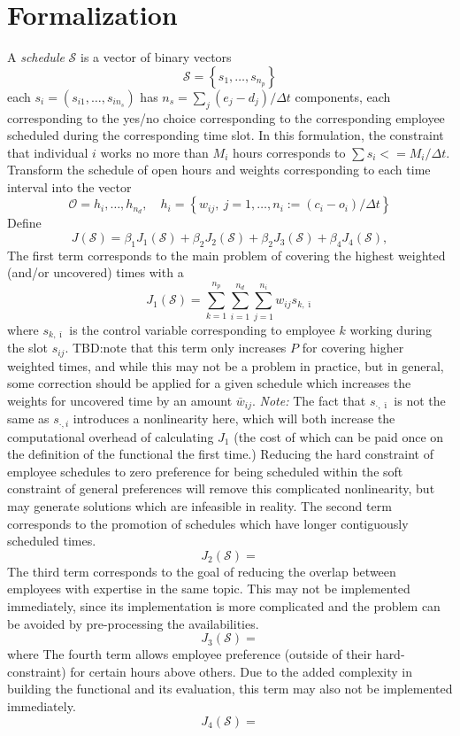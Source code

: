 \documentclass[11pt, draft]{amsart}
\newcommand{\bk}[1]{\left\{#1\right\}}
\def\S{\mathcal{S}}
\begin{document}
\section{Formalization}
A \emph{schedule} $\S$ is a vector of binary vectors
\[
  \S = \bk{s_1, \ldots, s_{n_p}}
\]
each $s_i = (s_{i1},\ldots,s_{in_s})$ has $n_s = \sum_j (e_j - d_j) / {\Delta t}$ components, each corresponding
to the yes/no choice corresponding to the corresponding employee scheduled
during the corresponding time slot.
In this formulation, the constraint that individual $i$ works no more than $M_i$
hours corresponds to $\sum s_i <= M_i / {\Delta t}$.
Transform the schedule of open hours and weights corresponding to each time interval into the vector
\[
  \mathcal{O} = {h_i, \ldots, h_{n_d}},
  \quad h_i = \bk{w_{ij},~j=1,\ldots, n_i := (c_i - o_i)/{\Delta t}}
\]
Define
\[
  J(\S) = \beta_1 J_1(\S) + \beta_2 J_2(\S) + \beta_2 J_3(\S) + \beta_4 J_4(\S),
\]
The first term corresponds to the main problem of covering the highest weighted (and/or uncovered) times with a
\[
  J_1(\S) = \sum_{k=1}^{n_p} \sum_{i=1}^{n_d} \sum_{j=1}^{n_i}w_{ij} s_{k,\bar{\imath}}
\]
where $s_{k,\bar{\imath}}$ is the control variable corresponding to employee $k$
working during the slot $s_{ij}$.
TBD:\@ note that this term only increases $P$ for covering higher weighted times, and while this may not be a problem in practice, but in general, some correction should be applied for a given schedule which increases the weights for uncovered time by an amount $\bar{w}_{ij}$.
\emph{Note:} The fact that $s_{\cdot,\bar{\imath}}$ is not the same as $s_{\cdot,i}$ introduces a nonlinearity here, which will both increase the computational overhead of calculating $J_1$ (the cost of which can be paid once on the definition of the functional the first time.)
Reducing the hard constraint of employee schedules to zero preference for being scheduled within the soft constraint of general preferences will remove this complicated nonlinearity, but may generate solutions which are infeasible in reality.
%
The second term corresponds to the promotion of schedules which have longer contiguously scheduled times.
\[
  J_2(\S) =
\]
%
The third term corresponds to the goal of reducing the overlap between employees with expertise in the same topic.
This may not be implemented immediately, since its implementation is more complicated and the problem can be avoided by pre-processing the availabilities.
\[
  J_3(\S) =
\]
where
%
The fourth term allows employee preference (outside of their hard-constraint) for certain hours above others.
Due to the added complexity in building the functional and its evaluation, this term may also not be implemented immediately.
\[
  J_4(\S) =
\]
\end{document}
